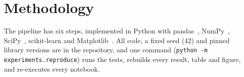 \section{Methodology}

The pipeline has six steps, implemented in Python with pandas~\cite{mckinney2010pandas},
NumPy~\cite{harris2020numpy}, SciPy~\cite{virtanen2020scipy}, scikit-learn and
Matplotlib~\cite{hunter2007matplotlib}. All code, a fixed seed (42) and pinned library versions
are in the repository, and one command (\texttt{python -m experiments.reproduce}) runs the tests, rebuilds
every result, table and figure, and re-executes every notebook.

